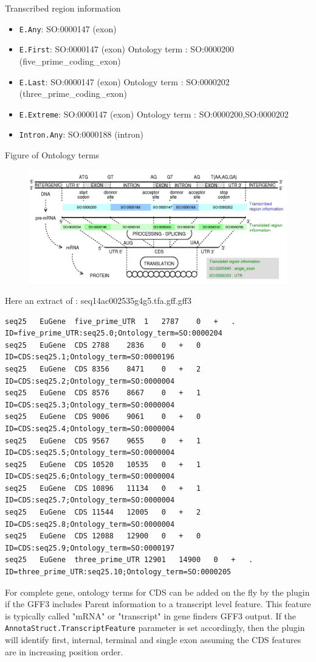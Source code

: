 Transcribed region information
\begin{itemize}
\item \texttt{E.Any}: 		SO:0000147 (exon)
\item \texttt{E.First}: 	SO:0000147 (exon)	Ontology term :	SO:0000200 (five\_prime\_coding\_exon)
\item \texttt{E.Last}: 		SO:0000147 (exon)	Ontology term :	SO:0000202 (three\_prime\_coding\_exon)
\item \texttt{E.Extreme}: 	SO:0000147 (exon)	Ontology term :	SO:0000200,SO:0000202
\item \texttt{Intron.Any}: 	SO:0000188 (intron)
\end{itemize}
Figure of Ontology terms

\begin{figure}[h]
\includegraphics[width=17cm]{SO.png} 
\end{figure}
Here an extract of : seq14ac002535g4g5.tfa.gff.gff3
\begin{Verbatim}[fontsize=\tiny]
seq25	EuGene	five_prime_UTR	1	2787	0	+	.	ID=five_prime_UTR:seq25.0;Ontology_term=SO:0000204
seq25	EuGene	CDS	2788	2836	0	+	0	ID=CDS:seq25.1;Ontology_term=SO:0000196
seq25	EuGene	CDS	8356	8471	0	+	2	ID=CDS:seq25.2;Ontology_term=SO:0000004
seq25	EuGene	CDS	8576	8667	0	+	1	ID=CDS:seq25.3;Ontology_term=SO:0000004
seq25	EuGene	CDS	9006	9061	0	+	0	ID=CDS:seq25.4;Ontology_term=SO:0000004
seq25	EuGene	CDS	9567	9655	0	+	1	ID=CDS:seq25.5;Ontology_term=SO:0000004
seq25	EuGene	CDS	10520	10535	0	+	1	ID=CDS:seq25.6;Ontology_term=SO:0000004
seq25	EuGene	CDS	10896	11134	0	+	1	ID=CDS:seq25.7;Ontology_term=SO:0000004
seq25	EuGene	CDS	11544	12005	0	+	2	ID=CDS:seq25.8;Ontology_term=SO:0000004
seq25	EuGene	CDS	12088	12900	0	+	0	ID=CDS:seq25.9;Ontology_term=SO:0000197
seq25	EuGene	three_prime_UTR	12901	14900	0	+	.	ID=three_prime_UTR:seq25.10;Ontology_term=SO:0000205
\end{Verbatim}

For complete gene, ontology terms for CDS can be added on the fly by the plugin if the GFF3 includes Parent information to a transcript level feature. This feature is typically called "mRNA" or "transcript" in gene finders GFF3 output.
If the \texttt{AnnotaStruct.TranscriptFeature} parameter is set accordingly, then the plugin will identify first, internal, terminal and single exon assuming the CDS features are in increasing position order.

